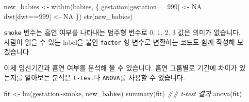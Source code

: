 \documentclass[
  a4paper,
]{book}
\newenvironment{Shaded}{\begin{snugshade}}{\end{snugshade}}
\newcommand{\ConstantTok}[1]{\textcolor[rgb]{0.56,0.35,0.01}{#1}}
\newcommand{\DecValTok}[1]{\textcolor[rgb]{0.68,0.00,0.00}{#1}}
\newcommand{\DocumentationTok}[1]{\textcolor[rgb]{0.37,0.37,0.37}{\textit{#1}}}
\newcommand{\FunctionTok}[1]{\textcolor[rgb]{0.28,0.35,0.67}{#1}}
\newcommand{\NormalTok}[1]{\textcolor[rgb]{0.00,0.23,0.31}{#1}}
\newcommand{\OtherTok}[1]{\textcolor[rgb]{0.00,0.23,0.31}{#1}}
\newcommand{\SpecialCharTok}[1]{\textcolor[rgb]{0.37,0.37,0.37}{#1}}
\newcommand{\StringTok}[1]{\textcolor[rgb]{0.13,0.47,0.30}{#1}}
\begin{document}
\begin{Shaded}
\begin{Highlighting}[]
\NormalTok{new\_babies }\OtherTok{\textless{}{-}} \FunctionTok{within}\NormalTok{(babies, \{}
\NormalTok{  gestation[gestation}\SpecialCharTok{==}\DecValTok{999}\NormalTok{] }\OtherTok{\textless{}{-}} \ConstantTok{NA}
\NormalTok{  dwt[dwt}\SpecialCharTok{==}\DecValTok{999}\NormalTok{] }\OtherTok{\textless{}{-}} \ConstantTok{NA}
\NormalTok{\})}
\FunctionTok{str}\NormalTok{(new\_babies)}
\end{Highlighting}
\end{Shaded}

\texttt{smoke} 변수는 흡연 여부를 나타내는 범주형 변수로 0, 1, 2, 3 값은
의미가 없습니다. 사람이 읽을 수 있는 label을 붙인 \texttt{factor} 형
변수로 변환하는 코드도 함께 작성해 보겠습니다.

\begin{Shaded}
\end{Shaded}

이제 임신기간과 흡연 여부를 분석해 볼 수 있습니다. 흡연 그룹별로 기간에
차이가 있는지를 알아보는 분석은 \texttt{t-test}나 \texttt{ANOVA}를
사용할 수 있습니다.

\begin{Shaded}
\begin{Highlighting}[]
\NormalTok{fit }\OtherTok{\textless{}{-}} \FunctionTok{lm}\NormalTok{(gestation}\SpecialCharTok{\textasciitilde{}}\NormalTok{smoke, new\_babies)}
\FunctionTok{summary}\NormalTok{(fit) }\DocumentationTok{\#\# t{-}test 결과 }
\FunctionTok{anova}\NormalTok{(fit)}
\end{Highlighting}
\end{Shaded}
\end{document}
